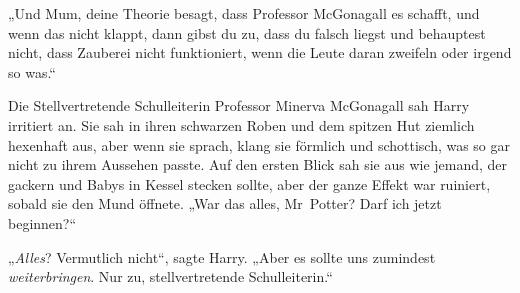 „Und Mum, deine Theorie besagt, dass Professor McGonagall es schafft, und wenn das nicht klappt, dann gibst du zu, dass du falsch liegst und behauptest nicht, dass Zauberei nicht funktioniert, wenn die Leute daran zweifeln oder irgend so was.“

Die Stellvertretende Schulleiterin Professor Minerva McGonagall sah Harry irritiert an. Sie sah in ihren schwarzen Roben und dem spitzen Hut ziemlich hexenhaft aus, aber wenn sie sprach, klang sie förmlich und schottisch, was so gar nicht zu ihrem Aussehen passte. Auf den ersten Blick sah sie aus wie jemand, der gackern und Babys in Kessel stecken sollte, aber der ganze Effekt war ruiniert, sobald sie den Mund öffnete.
„War das alles, Mr~Potter? Darf ich jetzt beginnen?“

„\emph{Alles}? Vermutlich nicht“, sagte Harry.
„Aber es sollte uns zumindest \emph{weiterbringen}. Nur zu, stellvertretende Schulleiterin.“

